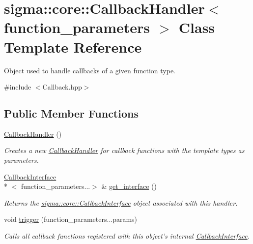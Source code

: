 \hypertarget{classsigma_1_1core_1_1_callback_handler}{\section{sigma\-:\-:core\-:\-:Callback\-Handler$<$ function\-\_\-parameters $>$ Class Template Reference}
\label{classsigma_1_1core_1_1_callback_handler}
}


Object used to handle callbacks of a given function type.  




{\ttfamily \#include $<$Callback.\-hpp$>$}

\subsection*{Public Member Functions}
\begin{DoxyCompactItemize}
\item 
\hypertarget{classsigma_1_1core_1_1_callback_handler_a640cd1f70da16d82b91a52f6c4e3a7bb}{\hyperlink{classsigma_1_1core_1_1_callback_handler_a640cd1f70da16d82b91a52f6c4e3a7bb}{Callback\-Handler} ()}\label{classsigma_1_1core_1_1_callback_handler_a640cd1f70da16d82b91a52f6c4e3a7bb}

\begin{DoxyCompactList}\small\item\em Creates a new \hyperlink{classsigma_1_1core_1_1_callback_handler}{Callback\-Handler} for callback functions with the template types as parameters. \end{DoxyCompactList}\item 
\hyperlink{classsigma_1_1core_1_1_callback_interface}{Callback\-Interface}\\*
$<$ function\-\_\-parameters...$>$ \& \hyperlink{classsigma_1_1core_1_1_callback_handler_ab9ba3abc6d94c0726de2c1dfa0056da0}{get\-\_\-interface} ()
\begin{DoxyCompactList}\small\item\em Returns the \hyperlink{classsigma_1_1core_1_1_callback_interface}{sigma\-::core\-::\-Callback\-Interface} object associated with this handler. \end{DoxyCompactList}\item 
void \hyperlink{classsigma_1_1core_1_1_callback_handler_a565178d287893492a86112d67a5302f8}{trigger} (function\-\_\-parameters...\-params)
\begin{DoxyCompactList}\small\item\em Calls all callback functions registered with this object's internal \hyperlink{classsigma_1_1core_1_1_callback_interface}{Callback\-Interface}. \end{DoxyCompactList}\end{DoxyCompactItemize}



